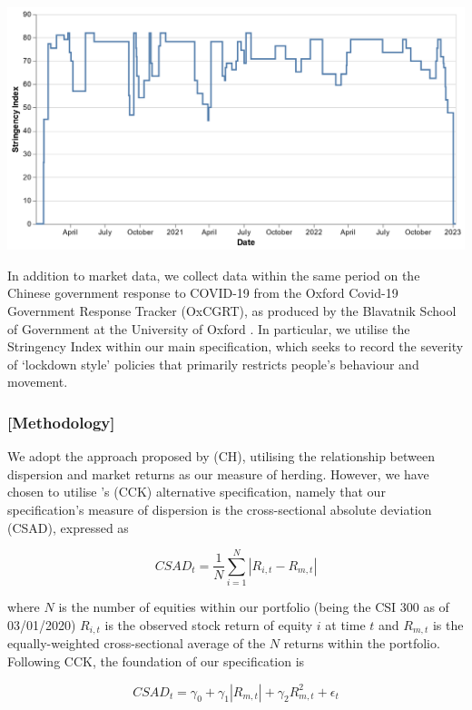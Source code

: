 \documentclass[12pt]{article}
\numberwithin{table}{section}   %
\begin{document}
\begin{center}
    
\includegraphics[scale=0.4]{graphics/stringency_line.png}

\end{center}

In addition to market data, we collect data within the same period on the Chinese government response to COVID-19 from the Oxford Covid-19 Government Response Tracker (OxCGRT), as produced by the Blavatnik School of Government at the University of Oxford \citep{OxCGRT}. In particular, we utilise the Stringency Index within our main specification, which seeks to record the severity of ‘lockdown style’ policies that primarily restricts people’s behaviour and movement.

\subsubsection*{[Methodology]}

We adopt the approach proposed by \citet{ch} (CH), utilising the relationship between dispersion and market returns as our measure of herding. However, we have chosen to utilise \citet{cck}'s (CCK) alternative specification, namely that our specification’s measure of dispersion is the cross-sectional absolute deviation (CSAD), expressed as

$$
CSAD_t=\frac{1}{N}\sum^N_{i=1}|R_{i,t}-R_{m,t}|
$$

where $N$ is the number of equities within our portfolio (being the CSI 300 as of 03/01/2020) $R_{i,t}$ is the observed stock return of equity $i$ at time $t$ and $R_{m,t}$ is the equally-weighted cross-sectional average of the $N$ returns within the portfolio. Following CCK, the foundation of our specification is

$$
CSAD_t=\gamma_0+\gamma_1 |R_{m,t}|+\gamma_2 R_{m,t}^2+\epsilon_t
$$
\end{document}
